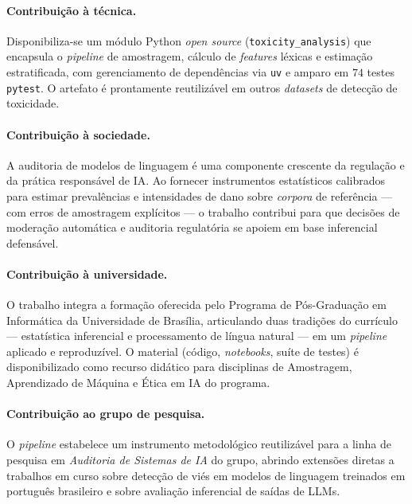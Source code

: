 \paragraph{Contribuição à técnica.} Disponibiliza-se um módulo Python
\textit{open source} (\texttt{toxicity\_analysis}) que encapsula o
\textit{pipeline} de amostragem, cálculo de \textit{features} léxicas e
estimação estratificada, com gerenciamento de dependências via \texttt{uv} e
amparo em $74$ testes \texttt{pytest}. O artefato é prontamente reutilizável
em outros \textit{datasets} de detecção de toxicidade.

\paragraph{Contribuição à sociedade.} A auditoria de modelos de linguagem é
uma componente crescente da regulação e da prática responsável de IA. Ao
fornecer instrumentos estatísticos calibrados para estimar prevalências e
intensidades de dano sobre \textit{corpora} de referência --- com erros de
amostragem explícitos --- o trabalho contribui para que decisões de
moderação automática e auditoria regulatória se apoiem em base inferencial
defensável.

\paragraph{Contribuição à universidade.} O trabalho integra a formação
oferecida pelo Programa de Pós-Graduação em Informática da Universidade de
Brasília, articulando duas tradições do currículo --- estatística inferencial
e processamento de língua natural --- em um \textit{pipeline} aplicado e
reproduzível. O material (código, \textit{notebooks}, suíte de testes) é
disponibilizado como recurso didático para disciplinas de Amostragem,
Aprendizado de Máquina e Ética em IA do programa.

\paragraph{Contribuição ao grupo de pesquisa.} O \textit{pipeline} estabelece
um instrumento metodológico reutilizável para a linha de pesquisa em
\textit{Auditoria de Sistemas de IA} do grupo, abrindo extensões diretas a
trabalhos em curso sobre detecção de viés em modelos de linguagem treinados
em português brasileiro e sobre avaliação inferencial de saídas de LLMs.

